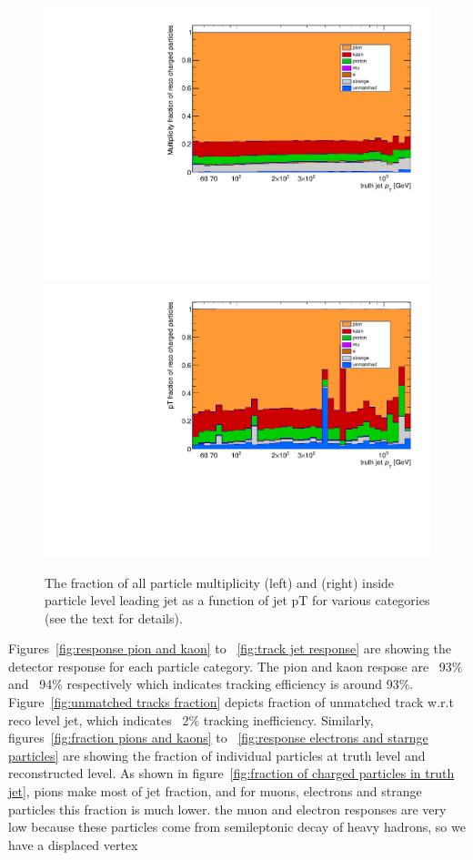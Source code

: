 \begin{figure}
\centering
\includegraphics[scale=0.3, page=3]{figures/jet_comp_study_powheg_Tight_MultiplicityFraction.pdf}
\hspace{2mm}
\includegraphics[scale=0.3, page=3]{figures/jet_comp_study_powheg_Tight_pTFraction.pdf}
\caption {The fraction of all particle multiplicity (left) and \pT (right) inside particle level leading jet as a function of jet pT for various categories (see the text for details).}
\label{fig:fraction of all particles in truth jet}
\end{figure}

Figures~\ref{fig:response pion and kaon} to ~\ref{fig:track jet response} are showing the detector response for each particle category. The pion and kaon respose are ~93\% and ~94\% respectively which indicates tracking efficiency is around 93\%. Figure~\ref{fig:unmatched tracks fraction} depicts fraction of unmatched track w.r.t reco level jet, which indicates ~2\% tracking inefficiency. Similarly, figures~\ref{fig:fraction pions and kaons} to ~\ref{fig:response electrons and starnge particles} are showing the fraction of individual particles at truth level and reconstructed level. As shown in figure~\ref{fig:fraction of charged particles in truth jet}, pions make most of jet fraction, and for muons, electrons and strange particles this fraction is much lower. the muon and electron responses are very low because these particles come from semileptonic decay of heavy hadrons, so we have a displaced vertex

